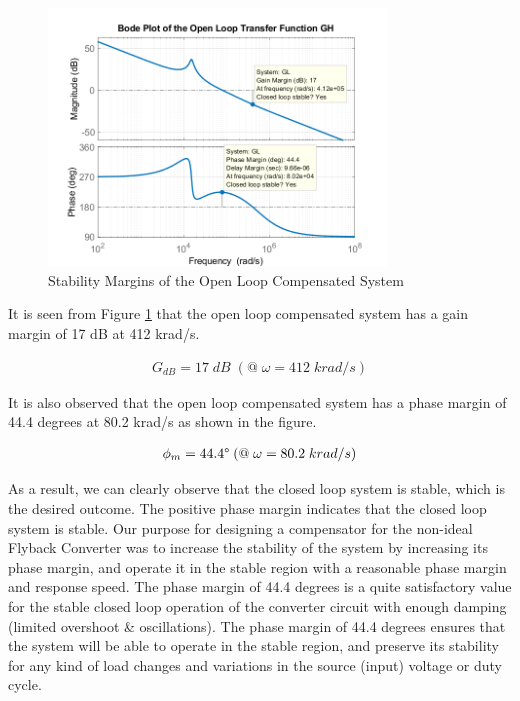 \begin{figure}[H]
\begin{center}
\includegraphics[width=0.8\textwidth]{bode_plots/OpenLoop_bode2.png}
\caption{Stability Margins of the Open Loop Compensated System}
\label{com:openloop_bode2}
\end{center}
\end{figure}

It is seen from Figure \ref{com:openloop_bode2} that the open loop compensated system has a gain margin of 17 dB at 412 krad/s.

\begin{align}
    G_{dB} = 17\;dB \;(@\;\omega = 412\;krad/s)
\end{align}

It is also observed that the open loop compensated system has a phase margin of 44.4 degrees at 80.2 krad/s as shown in the figure.

\begin{align}
    \phi_{m} = 44.4\degree \;(@\;\omega = 80.2\;krad/s)
\end{align}

As a result, we can clearly observe that the closed loop system is stable, which is the desired outcome. The positive phase margin indicates that the closed loop system is stable. Our purpose for designing a compensator for the non-ideal Flyback Converter was to increase the stability of the system by increasing its phase margin, and operate it in the stable region with a reasonable phase margin and response speed. The phase margin of 44.4 degrees is a quite satisfactory value for the stable closed loop operation of the converter circuit with enough damping (limited overshoot \& oscillations). The phase margin of 44.4 degrees ensures that the system will be able to operate in the stable region, and preserve its stability for any kind of load changes and variations in the source (input) voltage or duty cycle.

